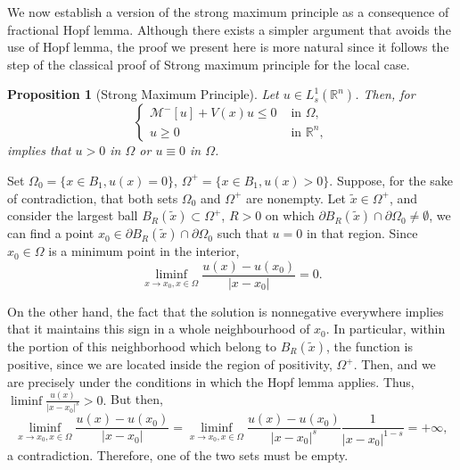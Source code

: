 \documentclass[11pt]{article}
\newtheorem{proposition}{Proposition}
\begin{document}
We now establish a version of the strong maximum principle as a consequence of fractional Hopf lemma. Although there exists a simpler argument that avoids the use of Hopf lemma, the proof we present here is more natural since it follows the step of the classical proof of Strong maximum principle for the local case.

\begin{proposition}[{Strong Maximum Principle}]\label{SMP} Let \(u\in L^{1}_{s}(\mathbb{R}^{n})\). Then, for
\begin{equation*}
    \begin{cases}
    \mathcal{M}^{-}[u] + V(x)u \leq 0  & \text{ in } \Omega, \\ 
    u \geq 0 & \text{ in }\mathbb{R}^{n},
    \end{cases}
\end{equation*}
implies that \(u>0\) in \(\Omega\) or \(u\equiv 0\) in \(\Omega\).
\end{proposition}

\proof Set \(\Omega_{0} = \{x\in B_{1}, u(x)=0\}\), \(\Omega^{+} = \{x\in B_{1}, u(x) > 0\}\). Suppose, for the sake of contradiction, that both sets \(\Omega_{0}\) and \(\Omega^{+}\) are nonempty.
Let \(\widetilde{x} \in \Omega^{+}\), and consider the largest ball \(B_{R}(\widetilde{x})\subset \Omega^{+}\), \(R>0\) on which \(\partial B_{R}(\widetilde{x})\cap \partial\Omega_{0} \neq \emptyset\), we can find a point \(x_0 \in \partial B_{R}(\widetilde{x})\cap \partial\Omega_{0} \) such that \(u=0\) in that region. Since \(x_0\in\Omega\) is a minimum point in the interior, 
\begin{equation*}
  \textstyle  \liminf_{x\to x_0, x\in\Omega}\frac{u(x) - u(x_0)}{|x-x_0|} = 0.
\end{equation*}

On the other hand, the fact that the solution is nonnegative everywhere implies that it maintains this sign in a whole neighbourhood of \(x_0\). In particular, within the portion of this neighborhood which belong to \(B_{R}(\widetilde{x})\), the function is positive, since we are located inside the region of positivity, \(\Omega^{+}\). Then, and we are precisely under the conditions in which the Hopf lemma applies. Thus, $\liminf\frac{u(x)}{|x-x_{0}|^{s}}>0.$ But then, 
\begin{equation*}
 \textstyle   \liminf_{x\to x_0, x\in\Omega}\frac{u(x) - u(x_0)}{|x-x_0|} = \liminf_{x\to x_0, x\in\Omega}\frac{u(x) - u(x_0)}{|x-x_0|^{s}}\frac{1}{|x-x_0|^{1-s}} = +\infty,
\end{equation*}
a contradiction. Therefore, one of the two sets must be empty.
\endproof
\end{document}
